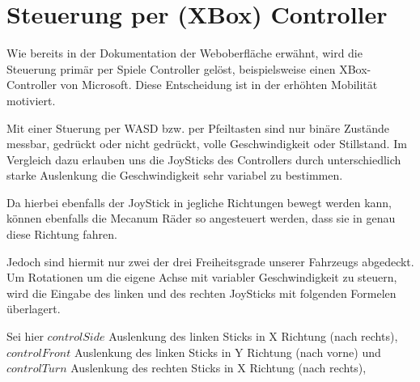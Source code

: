 \begin{table}[ht]
	\centering
\caption{Binäres Protokoll} 
\label{table:protokoll}
\end{table} 



\section{Steuerung per (XBox) Controller}
Wie bereits in der Dokumentation der Weboberfläche erwähnt, wird die Steuerung primär per Spiele Controller gelöst, beispielsweise einen XBox-Controller von Microsoft.
Diese Entscheidung ist in der erhöhten Mobilität motiviert. 

Mit einer Stuerung per WASD bzw. per Pfeiltasten sind nur binäre Zustände messbar, gedrückt oder nicht gedrückt, volle Geschwindigkeit oder Stillstand.
Im Vergleich dazu erlauben uns die JoySticks des Controllers durch unterschiedlich starke Auslenkung die Geschwindigkeit sehr variabel zu bestimmen.

Da hierbei ebenfalls der JoyStick in jegliche Richtungen bewegt werden kann, können ebenfalls die Mecanum Räder so angesteuert werden, dass sie in genau diese Richtung fahren.

Jedoch sind hiermit nur zwei der drei Freiheitsgrade unserer Fahrzeugs abgedeckt. Um Rotationen um die eigene Achse mit variabler Geschwindigkeit zu steuern, wird die Eingabe des linken und des rechten JoySticks mit folgenden Formelen überlagert.

\bigskip
Sei hier $controlSide$ Auslenkung des linken Sticks in X Richtung (nach rechts), 
$controlFront$ Auslenkung des linken Sticks in Y Richtung (nach vorne) und 
$controlTurn$ Auslenkung des rechten Sticks in X Richtung (nach rechts), 

